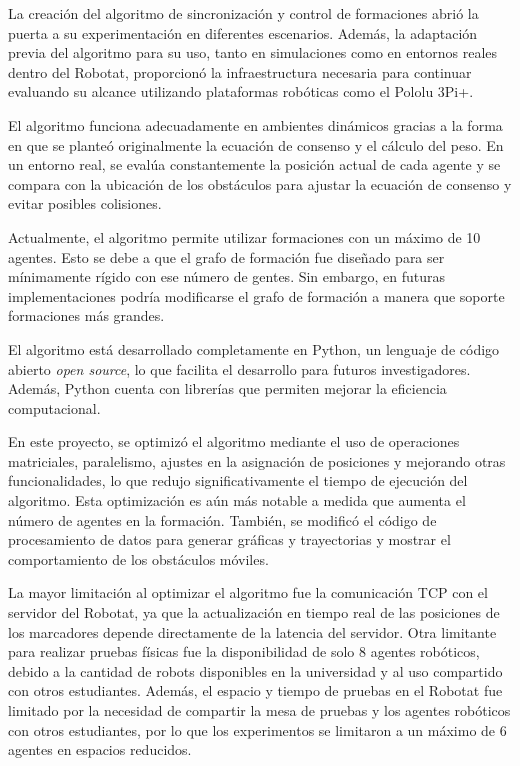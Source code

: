 La creación del algoritmo de sincronización y control de formaciones abrió la puerta a su experimentación en diferentes escenarios. Además, la adaptación previa del algoritmo para su uso, tanto en simulaciones como en entornos reales dentro del Robotat, proporcionó la infraestructura necesaria para continuar evaluando su alcance utilizando plataformas robóticas como el Pololu 3Pi+. 

El algoritmo funciona adecuadamente en ambientes dinámicos gracias a la forma en que se planteó originalmente la ecuación de consenso y el cálculo del peso. En un entorno real, se evalúa constantemente la posición actual de cada agente y se compara con la ubicación de los obstáculos para ajustar la ecuación de consenso y evitar posibles colisiones.

Actualmente, el algoritmo permite utilizar formaciones con un máximo de 10 agentes. Esto se debe a que el grafo de formación fue diseñado para ser mínimamente rígido con ese número de gentes. Sin embargo, en futuras implementaciones podría modificarse el grafo de formación a manera que soporte formaciones más grandes.

El algoritmo está desarrollado completamente en Python, un lenguaje de código abierto \textit{open source}, lo que facilita el desarrollo para futuros investigadores. Además, Python cuenta con librerías que permiten mejorar la eficiencia computacional.

En este proyecto, se optimizó el algoritmo mediante el uso de operaciones matriciales, paralelismo, ajustes en la asignación de posiciones y mejorando otras funcionalidades, lo que redujo significativamente el tiempo de ejecución del algoritmo. Esta optimización es aún más notable a medida que aumenta el número de agentes en la formación. También, se modificó el código de procesamiento de datos para generar gráficas y trayectorias y mostrar el comportamiento de los obstáculos móviles.

La mayor limitación al optimizar el algoritmo fue la comunicación TCP con el servidor del Robotat, ya que la actualización en tiempo real de las posiciones de los marcadores depende directamente de la latencia del servidor. Otra limitante para realizar pruebas físicas fue la disponibilidad de solo 8 agentes robóticos, debido a la cantidad de robots disponibles en la universidad y al uso compartido con otros estudiantes. Además, el espacio y tiempo de pruebas en el Robotat fue limitado por la necesidad de compartir la mesa de pruebas y los agentes robóticos con otros estudiantes, por lo que los experimentos se limitaron a un máximo de 6 agentes en espacios reducidos.

